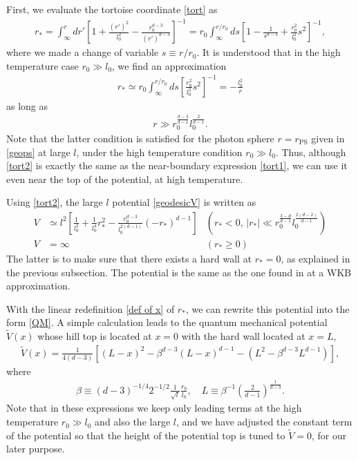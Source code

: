 \documentclass[a4paper,11pt]{article}
\begin{document}
First, we evaluate the tortoise coordinate \eqref{tort} as 
\begin{align}
    r_* = \int^r_\infty dr'\left[1 + \frac{(r')^2}{l_0^2} - \frac{r_0^{d-3}}{(r')^{d-3}}\right]^{-1}
    = r_0 \int^{r/r_0}_\infty 
    ds\left[1 -\frac{1}{s^{d-3}}+ \frac{r_0^2}{l_0^2}s^2 \right]^{-1} ,
\end{align}
where we made a change of variable $s\equiv r/r_0$. It is understood that in the high temperature case
$r_0 \gg l_0$, we find an approximation
\begin{align}
    r_* \simeq r_0 \int^{r/r_0}_\infty 
    ds\left[ \frac{r_0^2}{l_0^2}s^2 \right]^{-1} = -\frac{l_0^2}{r}
    \label{tort2}
\end{align}
as long as 
\begin{align}
    r \gg 
r_0^{\frac{d-3}{d-1}} l_0^\frac{2}{d-1}.
\end{align}
Note that the latter condition is satisfied for the photon sphere $r=r_\mathrm{PS}$ given in \eqref{geops} at large $l$, under the high temperature condition $r_0 \gg l_0$. Thus, although \eqref{tort2} is exactly the same as the near-boundary expression \eqref{tort1}, we can use it even near the top of the potential, at high temperature.

Using \eqref{tort2}, the large $l$ potential \eqref{geodesicV} is written as
\begin{align}
    V & \simeq
    l^2
 \left[
     \frac{1}{l_0^2}+\frac{1}{l_0^4}r_*^2 - \frac{r_0^{d-3}}{l_0^{2(d-1)}}(-r_*)^{d-1}
 \right]
 & 
 \left(r_*<0, \, |r_*| \ll r_0^{\frac{3-d}{d-1}} l_0^{\frac{2(d-2)}{d-1}}
 \right)
 \label{Vasymp}\\
 V & = \infty &  (r_* \geq 0)
\end{align}
The latter is to make sure that there exists a hard wall at $r_*=0$, as explained in the previous subsection.
The potential is the same as the one found in \cite{Festuccia:2008zx} at a WKB approximation.

With the linear redefinition \eqref{def of x} of $r_*$, we can rewrite this potential into the form \eqref{QM}. 
A simple calculation leads to the quantum mechanical potential $\widetilde{V}(x)$
whose hill top is located at $x=0$ with the hard wall located at $x=L$,
\begin{align}
    \widetilde{V}(x) = \frac{1}{4(d-3)}
    \left[
    (L-x)^2 - \beta^{d-3}(L-x)^{d-1} -\left(L^2-\beta^{d-3}L^{d-1}\right)
    \right],
    \label{Vuni}
\end{align}
where
\begin{align}
    \beta \equiv (d-3)^{-1/4} 2^{-1/2} \frac{1}{\sqrt{l}} \frac{r_0}{l_0}, \quad
    L \equiv \beta^{-1} \left(\frac{2}{d-1}\right)^{\frac{1}{d-3}}.
    \label{defL}
\end{align}
Note that in these expressions we keep only leading terms at the high temperature $r_0 \gg l_0$ and also the large $l$, and
we have adjusted the constant term of the potential
so that the height of the potential top is tuned to $\widetilde{V}=0$, for our later purpose.
\end{document}
